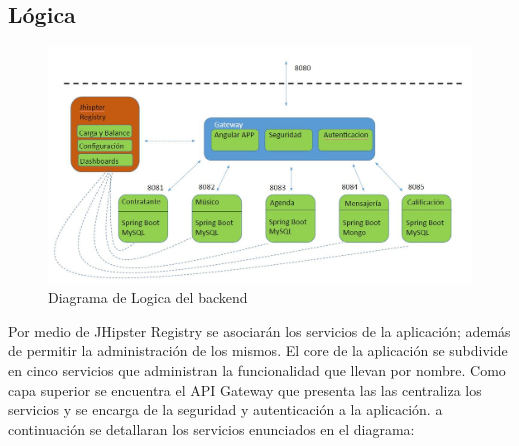 \subsection{Lógica}
\begin{figure}[h!]
 \centering
\includegraphics[width=\linewidth]{Desarrollo/Arquitectura/imgs/servicios.JPG}
\caption{Diagrama de Logica del backend}
\end{figure}
Por medio de JHipster Registry se asociarán los servicios de la aplicación; además de permitir la administración de los mismos. El core de la aplicación se subdivide en cinco servicios que administran la funcionalidad que llevan por nombre. Como capa superior se encuentra el API Gateway que presenta las las centraliza los servicios y se encarga de la seguridad y autenticación a la aplicación.
a continuación se detallaran los servicios enunciados en el diagrama:\\
